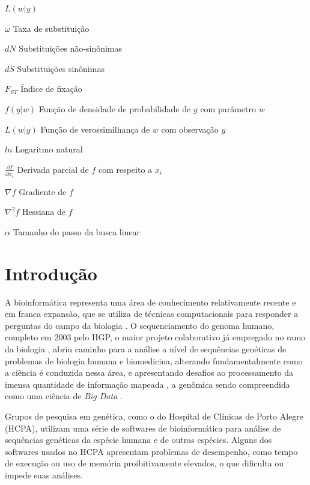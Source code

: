 \documentclass[cic,tc]{iiufrgs}
\begin{document}
\begin{listofsymbols}{$L(w|y)$}
    \item[$\omega$] Taxa de substituição
    \item[$dN$] Substituições não-sinônimas
    \item[$dS$] Substituições sinônimas
    \item[$F_{ST}$] Índice de fixação
    \item[$f(y|w)$] Função de densidade de probabilidade de $y$ com parâmetro $w$
    \item[$L(w|y)$] Função de verossimilhança de $w$ com observação $y$
    \item[$ln$] Logaritmo natural
    \item[$\frac{\partial f}{\partial x_i}$] Derivada parcial de $f$ com respeito a $x_i$
    \item[$\nabla f$] Gradiente de $f$
    \item[$\nabla^2 f$] Hessiana de $f$
    \item[$\alpha$] Tamanho do passo da busca linear
\end{listofsymbols}

\tableofcontents

%
%
%
%

\chapter{Introdução}
\label{chap:intro}

%
%
A bioinformática representa uma área de conhecimento relativamente recente e em
franca expansão, que se utiliza de técnicas computacionais para responder a
perguntas do campo da biologia \cite{baxevanis2020bioinformatics}. O
sequenciamento do genoma humano, completo em 2003 pelo HGP, o maior projeto
colaborativo já empregado no ramo da biologia \cite{tripp2011economic}, abriu
caminho para a análise a nível de sequências genéticas de problemas de biologia
humana e biomedicina, alterando fundamentalmente como a ciência é conduzida
nessa área, e apresentando desafios ao processamento da imensa quantidade de
informação mapeada \cite{baxevanis2020bioinformatics}, a genômica sendo
compreendida como uma ciência de \textit{Big Data} \cite{nsr2014bigdata} \cite{stephens2015big}.

%
%
Grupos de pesquisa em genética, como o do Hospital de Clínicas de Porto Alegre
(HCPA), utilizam uma série de softwares de bioinformática para análise de
sequências genéticas da espécie humana e de outras espécies. Alguns dos
softwares usados no HCPA apresentam problemas de desempenho, como tempo de
execução ou uso de memória proibitivamente elevados, o que dificulta ou impede
suas análises.
\end{document}
